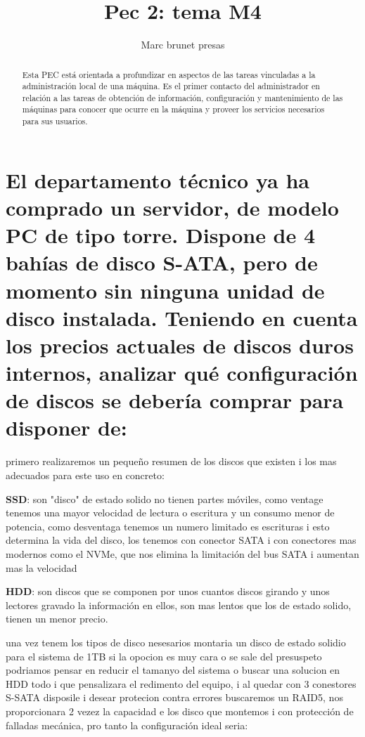 \documentclass[preprint,11pt]{elsarticle}
\begin{document}
\begin{frontmatter}

    \title{Pec 2: tema M4}
    \author{Marc brunet presas}
    \address{Manresa, Barcelona,}
    \begin{abstract}
    Esta PEC está orientada a profundizar en aspectos de las tareas vinculadas a la administración local de una máquina. Es el primer contacto del administrador en relación a las tareas de obtención de información, configuración y mantenimiento de las máquinas para conocer que ocurre en la máquina y proveer los servicios necesarios para sus usuarios.

    \end{abstract}
\end{frontmatter}

\section{El departamento técnico ya ha comprado un servidor, de modelo PC de tipo torre. Dispone de 4 bahías de disco S-ATA, pero de momento sin ninguna unidad de disco instalada. Teniendo en cuenta los precios actuales de discos duros internos, analizar qué configuración de discos se debería comprar para disponer de:}

primero realizaremos un pequeño resumen de los discos que existen i los mas adecuados para este uso en concreto:\smallskip

\textbf{SSD}: son "disco" de estado solido no tienen partes móviles, como ventage tenemos una mayor velocidad de lectura o escritura y un consumo menor de potencia, como desventaga tenemos un numero limitado es escrituras i esto determina la vida del disco, los tenemos con conector SATA i con conectores mas modernos como el NVMe, que nos elimina la limitación del bus SATA i aumentan mas la velocidad \smallskip

\textbf{HDD}: son discos que se componen por unos cuantos discos girando y unos lectores gravado la información en ellos, son mas lentos que los de estado solido, tienen un menor precio. \smallskip

una vez tenem los tipos de disco nesesarios montaria un disco de estado solidio para el sistema de 1TB si la opocion es muy cara o se sale del presuspeto podriamos pensar en reducir el tamanyo del sistema o buscar una solucion en HDD todo i que pensalizara el redimento del equipo, i al quedar con 3 conestores S-SATA disposile i desear protecion contra errores buscaremos un RAID5, nos proporcionara 2 vezez la capacidad e los disco que montemos i con protección de falladas mecánica, pro tanto la configuración ideal seria:\smallskip
\end{document}
